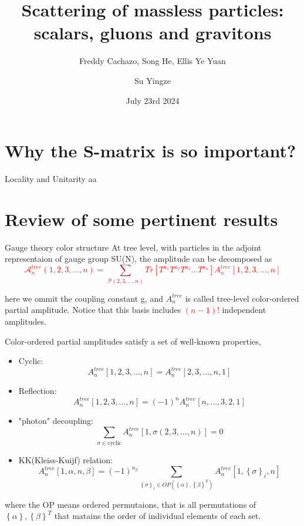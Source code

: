 \documentclass{beamer}
\title[CHY formula]{Scattering of massless particles: scalars, gluons and gravitons}
\subtitle{Freddy Cachazo, Song He, Ellis Ye Yuan}
\author{Su Yingze}
\institute{Nagoya University}
\date[7 23rd 2024]{July 23rd 2024}
\begin{document}
\frame{\titlepage}

\section{Why the S-matrix is so important?}
\begin{frame}{Locality and Unitarity}
    aa
\end{frame}
\section{Review of some pertinent results}
\begin{frame}{Gauge theory color structure}
    At tree level, with particles in the adjoint representaion of gauge group SU(N), the amplitude can be 
decomposed as
\textcolor{red}{\begin{equation*}
    \mathcal{A}_n^{tree}(1,2,3,\dots,n)=\sum _{\mathcal{P}(2,3,\dots,n)}Tr[T^{a_1}T^{a_2}T^{a_3}\dots
    T^{a_n}]A_n^{tree}[1,2,3,\dots,n]
\end{equation*}}

here we ommit the coupling constant g, and $A_n^{tree}$ is called tree-level color-ordered partial amplitude.
Notice that this basis includes \textcolor{red}{$(n-1)!$} independent amplitudes.
\end{frame}
\begin{frame}
    Color-ordered partial amplitudes satisfy a set of well-known properties,
    \begin{itemize}
        \item Cyclic:\quad $$A_n^{tree}[1,2,3,\dots,n]=A_n^{tree}[2,3,\dots,n,1]$$
        \item Reflection: \quad $$A_n^{tree}[1,2,3,\dots,n]=(-1)^nA_n^{tree}[n,\dots,3,2,1]$$
        \item "photon" decoupling: \quad $$\sum_{\sigma\in \text{cyclic}}A_n^{tree}[1,\sigma(2,3,\dots,n)]=0$$
        \item KK(Kleiss-Kuijf) relation:\quad $$A_n^{tree}[1,{\alpha},n,{\beta}]=(-1)^{n_\beta}
        \sum_{\left\{\sigma\right\}_i\in OP(\left\{\alpha\right\},\left\{\beta\right\}^T)}A_n^{tree}[1,\left\{\sigma\right\}_i,n]$$
    \end{itemize}
    where the OP means ordered permutaions, that is all permutations of$\left\{\alpha\right\},\left\{\beta\right\}^T$
    that matains the order of individual elements of each set.
\end{frame}
\end{document}
